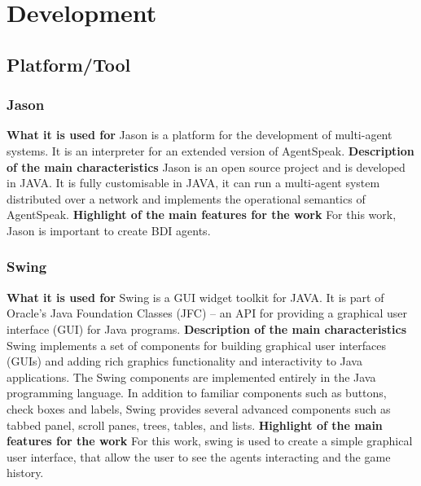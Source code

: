\documentclass{article}
\begin{document}
\section{Development}
\subsection{Platform/Tool}
\subsubsection{Jason}
\textbf{What it is used for}\newline
Jason is a platform for the development of multi-agent systems. It is an interpreter for an extended version of AgentSpeak.
\newline\textbf{Description of the main characteristics}\newline
Jason is an open source project and is developed in JAVA. It is fully customisable in JAVA, it can run a multi-agent system distributed over a network and implements the operational semantics of AgentSpeak.
\newline\textbf{Highlight of the main features for the work}\newline
For this work, Jason is important to create BDI agents. 
\subsubsection{Swing}
\textbf{What it is used for}\newline
Swing is a GUI widget toolkit for JAVA. It is part of Oracle's Java Foundation Classes (JFC) – an API for providing a graphical user interface (GUI) for Java programs.
\newline\textbf{Description of the main characteristics}\newline
Swing implements a set of components for building graphical user interfaces (GUIs) and adding rich graphics functionality and interactivity to Java applications. The Swing components are implemented entirely in the Java programming language. In addition to familiar components such as buttons, check boxes and labels, Swing provides several advanced components such as tabbed panel, scroll panes, trees, tables, and lists.
\newline\textbf{Highlight of the main features for the work}\newline
For this work, swing is used to create a simple graphical user interface, that allow the user to see the agents interacting and the game history.
\end{document}
